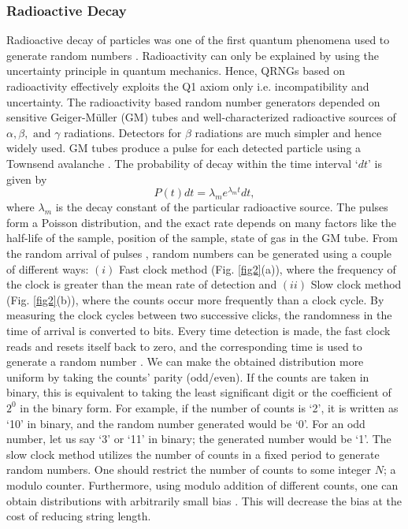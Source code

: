 \documentclass[]{interact}
\theoremstyle{plain}%
\theoremstyle{definition}
\theoremstyle{remark}
\begin{document}
\subsubsection{Radioactive Decay}
\label{radio}
 Radioactive decay of particles was one of the first quantum phenomena used to generate random numbers \cite{doi:10.1063/1.1658698}. Radioactivity can only be explained by using the uncertainty principle in quantum mechanics. Hence, QRNGs based on radioactivity effectively exploits the Q1 axiom only i.e. incompatibility and uncertainty.  The radioactivity based random number generators depended on sensitive Geiger-Müller (GM) tubes and well-characterized radioactive sources of $\alpha, \beta, \text { and } \gamma$ radiations. Detectors for $\beta$ radiations are much simpler and hence widely used. GM tubes produce a pulse for each detected particle using a Townsend avalanche \cite{1698087}. The probability of decay within the time interval `$dt$' is given by $$P(t)dt=\lambda_me^{\lambda_mt}dt,$$ where $\lambda_m$ is the decay constant of the particular radioactive source. The pulses form a Poisson distribution, and the exact rate depends on many factors like the half-life of the sample, position of the sample, state of gas in the GM tube. From the random arrival of pulses \cite{SILVERMAN1999265}, random numbers can be generated using a couple of different ways: $(i)$ Fast clock method \cite{Vincent_1970} (Fig. \ref{fig2}(a)), where the frequency of the clock is greater than the mean rate of detection and $(ii)$ Slow clock method \cite{doi:10.1063/1.1658698} (Fig. \ref{fig2}(b)), where the counts occur more frequently than a clock cycle. By measuring the clock cycles between two successive clicks, the randomness in the time of arrival is converted to bits. Every time detection is made, the fast clock reads and resets itself back to zero, and the corresponding time is used to generate a random number \cite{ishida1956random}. We can make the obtained distribution more uniform by taking the counts' parity (odd/even). If the counts are taken in binary, this is equivalent to taking the least significant digit or the coefficient of $2^0$ in the binary form. For example, if the number of counts is `2', it is written as `10' in binary, and the random number generated would be `0'. For an odd number, let us say `3' or `11' in binary; the generated number would be `1'. The slow clock method utilizes the number of counts in a fixed period to generate random numbers. One should restrict the number of counts to some integer $N$; a modulo counter. Furthermore, using modulo addition of different counts, one can obtain distributions with arbitrarily small bias \cite{doi:10.1063/1.1658698}. This will decrease the bias at the cost of reducing string length.
\end{document}
